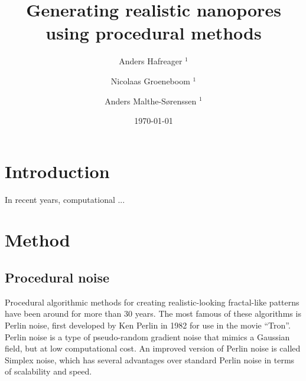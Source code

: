 \documentclass[aps,pre,twocolumn,letterpaper,floatfix,showpacs]{revtex4}
\begin{document}
\title{Generating realistic nanopores using procedural methods}
\author{Anders Hafreager $^{1}$} 
\author{Nicolaas Groeneboom $^{1}$} 
\author{Anders Malthe-S\o renssen $^1$}
\date{\today} 

\begin{abstract} 
\end{abstract} 
 
\maketitle
 
\section{Introduction}
In recent years, computational ...


\section{Method}


\subsection{Procedural noise}
\label{sec:perlin}

Procedural algorithmic methods for creating realistic-looking
fractal-like patterns have been around for more than 30 years. The most famous of these
algorithms is Perlin noise, first developed by Ken Perlin in 1982 for
use in the movie ``Tron''.  Perlin noise is a type of pseudo-random
gradient noise that mimics a Gaussian field, but at low computational cost. 
An improved version of Perlin noise is called Simplex
noise, which has several advantages over standard Perlin noise in
terms of scalability and speed.  
\end{document}
